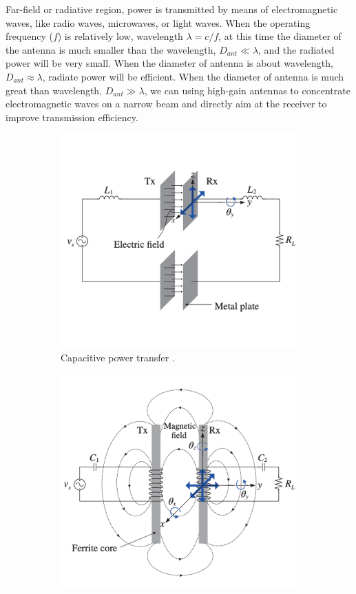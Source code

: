 Far-field or radiative region, power is transmitted by means of electromagnetic waves, like radio waves, microwaves, or light waves. When the operating frequency ($f$) is relatively low, wavelength $\lambda = c/f$, at this time the diameter of the antenna is much smaller than the wavelength, $D_{ant} \ll \lambda$, and the radiated power will be very small. When the diameter of antenna is about wavelength, $D_{ant} \approx \lambda$, radiate power will be efficient. When the diameter of antenna is much great than wavelength, $D_{ant} \gg \lambda$, we can using high-gain antennas to concentrate electromagnetic waves on a narrow beam and directly aim at the receiver to improve transmission efficiency.

\begin{figure}[!t]
    \begin{subfigure}{0.5\textwidth}
        \centering
        \includegraphics[width=0.9\linewidth]{images/1_capacitive_power_transfer.png}
        \caption{Capacitive power transfer \cite{Chun}.}
        \label{fig:subim1}
    \end{subfigure}
    \begin{subfigure}{0.5\textwidth}
        \centering
        \includegraphics[width=0.9\linewidth]{images/1_inductive_power_transfer.png}

\end{subfigure}
\end{figure}
